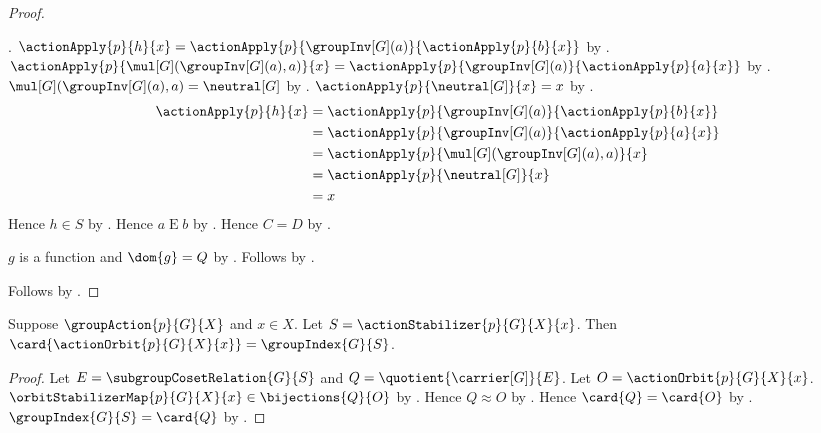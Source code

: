 \begin{proof}
\begin{subproof}
\begin{subproof}
                .
            $\actionApply{p}{h}{x}
                =\actionApply{p}{\groupInv[G](a)}{
                    \actionApply{p}{b}{x}}$ by
                .
            $\actionApply{p}{\mul[G](\groupInv[G](a),a)}{x}
                =\actionApply{p}{\groupInv[G](a)}{
                    \actionApply{p}{a}{x}}$ by
                .
            $\mul[G](\groupInv[G](a),a)=\neutral[G]$ by
                .
            $\actionApply{p}{\neutral[G]}{x}=x$ by
                .
            \begin{align*}
                \actionApply{p}{h}{x}
                    &= \actionApply{p}{\groupInv[G](a)}{
                        \actionApply{p}{b}{x}}
                    \\
                    &= \actionApply{p}{\groupInv[G](a)}{
                        \actionApply{p}{a}{x}}
                    \\
                    &= \actionApply{p}{
                        \mul[G](\groupInv[G](a),a)}{x}
                    \\
                    &= \actionApply{p}{\neutral[G]}{x}
                    \\
                    &= x
            \end{align*}
            Hence $h\in S$ by .
            Hence $a\mathrel{E}b$ by
                .
            Hence $C=D$ by
                .
        \end{subproof}
        $g$ is a function and $\dom{g}=Q$ by
            .
        Follows by .
    \end{subproof}
    Follows by .
\end{proof}

\begin{theorem}\label{orbit_stabilizer_cardinality}
    Suppose $\groupAction{p}{G}{X}$ and $x\in X$.
    Let $S=\actionStabilizer{p}{G}{X}{x}$.
    Then
        $\card{\actionOrbit{p}{G}{X}{x}}=\groupIndex{G}{S}$.
\end{theorem}
\begin{proof}
    Let $E=\subgroupCosetRelation{G}{S}$ and
        $Q=\quotient{\carrier[G]}{E}$.
    Let $O=\actionOrbit{p}{G}{X}{x}$.
    $\orbitStabilizerMap{p}{G}{X}{x}\in\bijections{Q}{O}$ by
        .
    Hence $Q\approx O$ by .
    Hence $\card{Q}=\card{O}$ by .
    $\groupIndex{G}{S}=\card{Q}$ by .
\end{proof}

